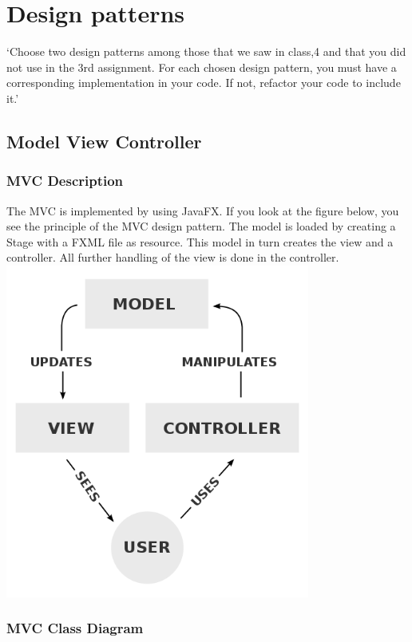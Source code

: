 \chapter{Design patterns}

`Choose two design patterns among those that we saw in class,4
and that you did not use in the 3rd assignment.
For each chosen design pattern, you must have a corresponding implementation in your code. If not,
refactor your code to include it.'

\section{Model View Controller}

\subsection{MVC Description}
The MVC is implemented by using JavaFX. If you look at the figure below, you see the principle of the MVC design pattern. The model is loaded by creating a Stage with a FXML file as resource. This model in turn creates the view and a controller. All further handling of the view is done in the controller. 
\\
\includegraphics[width=100mm]{MVC.png}

\subsection{MVC Class Diagram}

